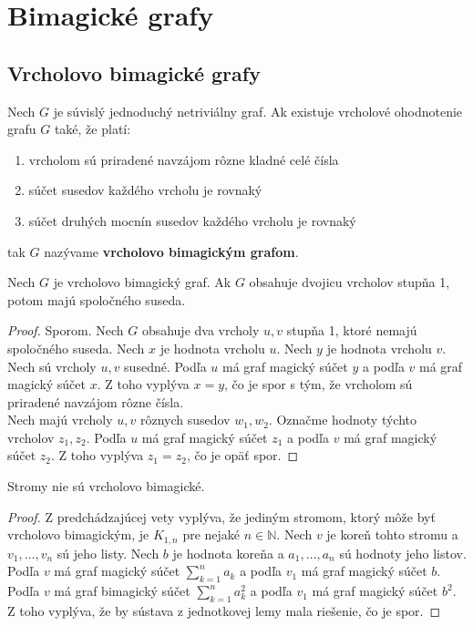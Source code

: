 \section{Bimagické grafy}

\subsection{Vrcholovo bimagické grafy}

\begin{definition} Nech $G$ je súvislý jednoduchý netriviálny graf. Ak existuje vrcholové ohodnotenie grafu $G$ také, že platí:
\begin{enumerate}
\item vrcholom sú priradené navzájom rôzne kladné celé čísla
\item súčet susedov každého vrcholu je rovnaký
\item súčet druhých mocnín susedov každého vrcholu je rovnaký
\end{enumerate}
tak $G$ nazývame \textbf{vrcholovo bimagickým grafom}.
\end{definition}

\begin{theorem}
\label{vbgdegree1}
Nech $G$ je vrcholovo bimagický graf. Ak $G$ obsahuje dvojicu vrcholov stupňa 1, potom majú spoločného suseda.
\end{theorem}

\begin{proof} Sporom. Nech $G$ obsahuje dva vrcholy $u,v$ stupňa 1, ktoré nemajú spoločného suseda. Nech $x$ je hodnota vrcholu $u$. Nech $y$ je hodnota vrcholu $v$. \\

Nech sú vrcholy $u,v$ susedné. Podľa $u$ má graf magický súčet $y$ a podľa $v$ má graf magický súčet $x$. Z toho vyplýva $x = y$, čo je spor s tým, že vrcholom sú priradené navzájom rôzne čísla. \\

Nech majú vrcholy $u,v$ rôznych susedov $w_1, w_2$. Označme hodnoty týchto vrcholov $z_1, z_2$. Podľa $u$ má graf magický súčet $z_1$ a podľa $v$ má graf magický súčet $z_2$. Z toho vyplýva $z_1 = z_2$, čo je opäť spor.
\end{proof} 

\begin{consequence} Stromy nie sú vrcholovo bimagické.
\end{consequence}

\begin{proof} Z predchádzajúcej vety vyplýva, že jediným stromom, ktorý môže byť vrcholovo bimagickým, je $K_{1,n}$ pre nejaké $n \in \mathbb{N}$. Nech $v$ je koreň tohto stromu a $v_1, \dots , v_n$ sú jeho listy. Nech $b$ je hodnota koreňa a $a_1, \dots , a_n$ sú hodnoty jeho listov. Podľa $v$ má graf magický súčet $\sum_{k=1}^{n} a_k$ a podľa $v_1$ má graf magický súčet $b$. Podľa $v$ má graf bimagický súčet $\sum_{k=1}^{n} a_k^2$ a podľa $v_1$ má graf magický súčet $b^2$. Z toho vyplýva, že by sústava z jednotkovej lemy mala riešenie, čo je spor.
\end{proof} 

